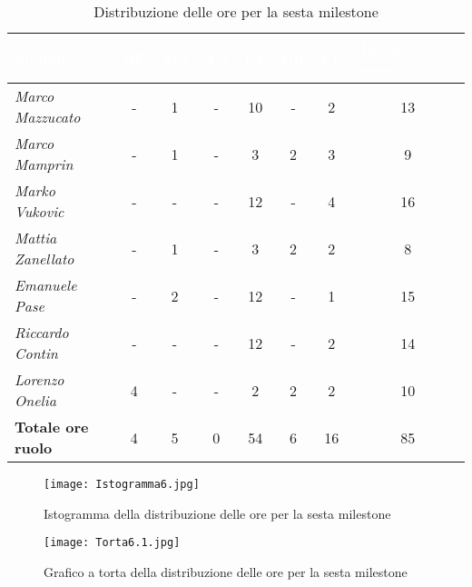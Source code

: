 \begin{table}[H]
    \renewcommand\arraystretch{1.5}
    \centering
    \begin{tabular}{|l|c|c|c|c|c|c|c|}
    \hline
    \rowcolor[HTML]{036400}
    \textcolor{white}{\textbf{Membro}} & \multicolumn{1}{l|}{\textcolor{white}{\textbf{RE}}} & \multicolumn{1}{l|}{\textcolor{white}{\textbf{AM}}} & \multicolumn{1}{l|}{\textcolor{white}{\textbf{AN}}} & \multicolumn{1}{l|}{\textcolor{white}{\textbf{PT}}} & \multicolumn{1}{l|}{\textcolor{white}{\textbf{PR}}} & \multicolumn{1}{l|}{\textcolor{white}{\textbf{VE}}} & \multicolumn{1}{l|}{\textcolor{white}{\textbf{Totale ore persona}}} \\ \hline
    \rowcolor[HTML]{EFEFEF}\textit{Marco Mazzucato}  & - & 1   & -  & 10    & -   & 2   & 13     \\ \hline
    \rowcolor[HTML]{C0C0C0}\textit{Marco Mamprin}    & - & 1   & -  & 3     & 2   & 3   & 9     \\ \hline
    \rowcolor[HTML]{EFEFEF}\textit{Marko Vukovic}    & - & -   & -  & 12    & -   & 4   & 16     \\ \hline
    \rowcolor[HTML]{C0C0C0}\textit{Mattia Zanellato} & - & 1   & -  & 3     & 2   & 2   & 8     \\ \hline
    \rowcolor[HTML]{EFEFEF}\textit{Emanuele Pase}    & - & 2   & -  & 12    & -   & 1   & 15     \\ \hline
    \rowcolor[HTML]{C0C0C0}\textit{Riccardo Contin}  & - & -   & -  & 12    & -   & 2   & 14     \\ \hline
    \rowcolor[HTML]{EFEFEF}\textit{Lorenzo Onelia}   & 4 & -   & -  & 2     & 2   & 2   & 10    \\ \hline
    \rowcolor[HTML]{C0C0C0}\textbf{Totale ore ruolo} & 4 & 5   & 0  & 54    & 6   & 16  & 85    \\ \hline
    \end{tabular}
    \caption{Distribuzione delle ore per la sesta milestone}
\end{table}

\begin{figure}[H]
    \texttt{[image: Istogramma6.jpg]}
    \caption{Istogramma della distribuzione delle ore per la sesta milestone}
\end{figure}

\begin{figure}[H]
    \texttt{[image: Torta6.1.jpg]}
    \caption{Grafico a torta della distribuzione delle ore per la sesta milestone}
\end{figure}

